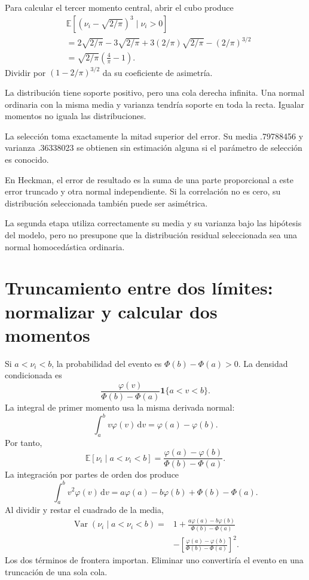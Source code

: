 \documentclass[11pt,a4paper]{article}
\newcommand{\E}{\mathbb E}
\newcommand{\dd}{\,\mathrm d}
\DeclareMathOperator{\Var}{Var}
\begin{document}
Para calcular el tercer momento central,
abrir el cubo produce
\[
\begin{aligned}
&\E[(\nu_i-\sqrt{2/\pi})^3\mid\nu_i>0]\\
&=2\sqrt{2/\pi}
-3\sqrt{2/\pi}
+3(2/\pi)\sqrt{2/\pi}
-(2/\pi)^{3/2}\\
&=\sqrt{2/\pi}\left(\frac4\pi-1\right).
\end{aligned}
\]
Dividir por \((1-2/\pi)^{3/2}\)
da su coeficiente de asimetría.

La distribución tiene soporte positivo,
pero una cola derecha infinita.
Una normal ordinaria con la misma
media y varianza tendría soporte
en toda la recta.
Igualar momentos no iguala
las distribuciones.

\begin{ejemplo}
La selección toma exactamente
la mitad superior del error.
Su media .79788456
y varianza .36338023
se obtienen sin estimación alguna
si el parámetro de selección es conocido.
\end{ejemplo}
En Heckman, el error de resultado
es la suma de una parte
proporcional a este error truncado
y otra normal independiente.
Si la correlación no es cero,
su distribución seleccionada
también puede ser asimétrica.

La segunda etapa utiliza correctamente
su media y su varianza
bajo las hipótesis del modelo,
pero no presupone que la
distribución residual seleccionada
sea una normal homocedástica ordinaria.

\clearpage
\section{Truncamiento entre dos límites: normalizar y calcular dos momentos}\label{unidad76}
Si \(a<\nu_i<b\), la probabilidad del evento es
\(\Phi(b)-\Phi(a)>0\).
La densidad condicionada es
\[
\frac{\varphi(v)}{\Phi(b)-\Phi(a)}
\mathbf1\{a<v<b\}.
\]
La integral de primer momento
usa la misma derivada normal:
\[
\int_a^b v\varphi(v)\dd v
=\varphi(a)-\varphi(b).
\]
Por tanto,
\[
\E[\nu_i\mid a<\nu_i<b]
=\frac{\varphi(a)-\varphi(b)}
{\Phi(b)-\Phi(a)}.
\]
La integración por partes de orden dos produce
\[
\int_a^b v^2\varphi(v)\dd v
=a\varphi(a)-b\varphi(b)+\Phi(b)-\Phi(a).
\]
Al dividir y restar el cuadrado de la media,
\[
\begin{aligned}
\Var(\nu_i\mid a<\nu_i<b)
={}&1+\frac{a\varphi(a)-b\varphi(b)}
{\Phi(b)-\Phi(a)}\\
&-\left[\frac{\varphi(a)-\varphi(b)}
{\Phi(b)-\Phi(a)}\right]^2.
\end{aligned}
\]
Los dos términos de frontera importan.
Eliminar uno convertiría el evento
en una truncación de una sola cola.
\end{document}
